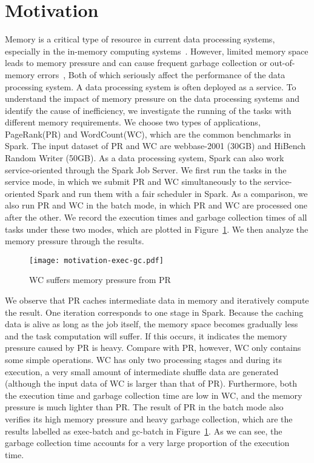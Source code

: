 \section{Motivation}
\label{sec:motivation}

Memory is a critical type of resource in current data processing systems, especially in the in-memory computing systems~\cite{shi:mammoth}. However, limited memory space leads to memory pressure and can cause frequent garbage collection or out-of-memory errors~\cite{fang2015interruptible}, Both of which seriously affect the performance of the data processing system. A data processing system is often deployed as a service. To understand the impact of memory pressure on the data processing systems and identify the cause of inefficiency, we investigate the running of the tasks with different memory requirements. We choose two types of applications, PageRank(PR) and WordCount(WC), which are the common benchmarks in Spark. The input dataset of PR and WC are webbase-2001 (30GB) and HiBench Random Writer (50GB). As a data processing system, Spark can also work service-oriented through the Spark Job Server. We first run the tasks in the service mode, in which we submit PR and WC simultaneously to the service-oriented Spark and run them with a fair scheduler in Spark. As a comparison, we also run PR and WC in the batch mode, in which PR and WC are processed one after the other. We record the execution times and garbage collection times of all tasks under these two modes, which are plotted in Figure~\ref{fig:memorypressure}. We then analyze the  memory pressure through the results.   

\begin{figure}[!t]
\centering
\texttt{[image: motivation-exec-gc.pdf]}
\vspace{-2mm}
\caption{WC suffers memory pressure from PR}
\vspace{-6mm}
\label{fig:memorypressure}
\end{figure}

We observe that PR caches intermediate data in memory and iteratively compute the result. One iteration corresponds to one stage in Spark. Because the caching data is alive as long as the job itself, the memory space becomes gradually less and the task computation will suffer. If this occurs, it indicates the memory pressure caused by PR is heavy. Compare with PR, however, WC only contains some simple operations. WC has only two processing stages and during its execution, a very small amount of intermediate shuffle data are generated (although the input data of WC is larger than that of PR). Furthermore, both the execution time and garbage collection time are low in WC, and the memory pressure is much lighter than PR. The result of PR in the batch mode also verifies its high memory pressure and heavy garbage collection, which are the results labelled as exec-batch and gc-batch in Figure~\ref{fig:memorypressure}. As we can see, the garbage collection time accounts for a very large proportion of the execution time.

